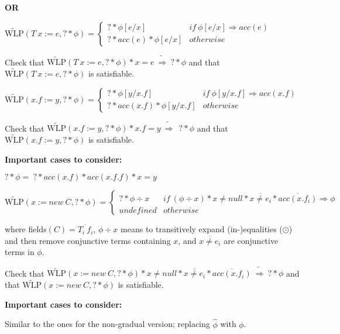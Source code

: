 \documentclass {article}
\newcommand{\eif}[3]{if \ ( #1 ) \ \{ #2 \} \ else \ \{#3\}}
\newcommand{\fphi}{\widehat{\phi}}
\newcommand{\imp}{\Rightarrow}
\newcommand{\timp}{\ \widetilde{\Rightarrow}\ }
\newcommand{\twlp}[2]{\widetilde{\text{WLP}}(#1,#2)}
\begin{document}
\textbf{OR}

$\twlp{T \ x := e}{? \ast \phi} =
	 \begin{cases}
	 ? \ast \phi[e/x] & if \ \phi[e/x] \imp acc(e) \\
	 ? \ast acc(e) \ast \phi[e/x] & otherwise
	\end{cases}$
	
Check that $\twlp{T \ x := e}{? \ast \phi} \ast x = e \timp ? \ast \phi$ and that $\twlp{T \ x := e}{? \ast \phi}$ is satisfiable.

\vspace{0.5cm}

%

$\twlp{x.f := y}{? \ast \phi} =
	\begin{cases}
	 ? \ast \phi[y/x.f] & if \ \phi[y/x.f] \imp acc(x.f) \\
	 ? \ast acc(x.f) \ast \phi[y/x.f] & otherwise
	\end{cases}$

Check that $\twlp{x.f := y}{? \ast \phi} \ast x.f = y \timp \ ? \ast \phi$ and that $\twlp{x.f := y}{? \ast \phi}$ is satisfiable.

\textbf{Important cases to consider:}

$? \ast \phi = \ ? \ast acc(x.f) \ast acc(x.f.f) \ast x = y $

\vspace{0.5cm}

$\twlp{x := new\ C}{? \ast \phi} = 
	\begin{cases}
	 ? \ast \phi \div x & if \ (\phi \div x) \ast x \neq null \ast \overline{x \neq e_i} \ast \overline{acc(x.f_i)} \imp \phi \\
	 undefined & otherwise
	\end{cases}$ 

where fields$(C) = \overline{T_i \ f_i}$, $\phi \div x$ means to transitively expand (in-)equalities ($\odot$) and then remove conjunctive terms containing $x$, and $\overline{x \neq e_i}$ are conjunctive terms in $\phi$. 

Check that $\twlp{x := new\ C}{? \ast \phi} \ast x \neq null \ast \overline{x \neq e_i} \ast \overline{acc(x.f_i)} \timp ? \ast \phi$ and that $\twlp{x := new\ C}{? \ast \phi}$ is satisfiable.

\textbf{Important cases to consider:}

Similar to the ones for the non-gradual version; replacing $\fphi$ with $\phi$.
\end{document}
